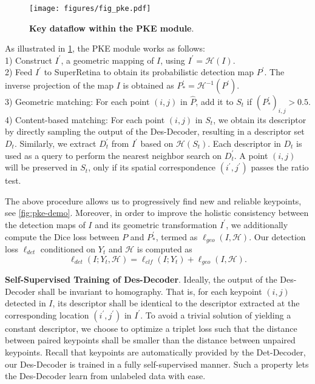 \begin{figure}[htb!]
  \centering
\texttt{[image: figures/fig\_pke.pdf]}
   \caption{\textbf{Key dataflow within the PKE module}.}
   \label{fig:pke-flow}
\end{figure} 
As illustrated in \cref{fig:pke-flow}, the PKE module works as follows: \\
1) Construct $I^\prime$, a geometric mapping of $I$, using $I^\prime = \mathcal{H}(I)$.\\
2) Feed $I^\prime$ to SuperRetina to obtain its probabilistic detection map $P^\prime$. The inverse projection of the map \wrt $I$ is obtained as  $P^\prime_*=\mathcal{H}^{-1}(P^{\prime})$.  \\
3) Geometric matching: For each point $(i,j)$ in $\widehat{P}$, add it to $S_t$ if ${(P^\prime_*)}_{i,j}>0.5$. \\
4) Content-based matching: For each point $(i,j)$ in $S_t$, we obtain its descriptor by directly sampling the output of the Des-Decoder, resulting in a descriptor set $D_t$. Similarly, we extract $D^\prime_t$ from $I^\prime$ based on $\mathcal{H}(S_t)$. Each descriptor in $D_t$ is used as a query to perform the nearest neighbor search on $D^\prime_t$. A point $(i,j)$ will be preserved in $S_t$, only if its spatial correspondence $(i^\prime,j^\prime)$ passes the ratio test.

The above procedure allows us to progressively find new and reliable keypoints, see \cref{fig:pke-demo}. Moreover, in order to improve the holistic consistency between the detection maps of $I$ and its geometric transformation $I^\prime$, we additionally compute the Dice loss between $P$ and $P^\prime_*$, termed as $\ell_{geo}(I,\mathcal{H})$.  Our detection loss $\ell_{det}$ conditioned on  $Y_t$ and $\mathcal{H}$ is computed as 
\begin{equation} \label{eq:det-loss}
\ell_{det}(I; Y_t, \mathcal{H}) = \ell_{clf}(I; Y_t) + \ell_{geo}(I,\mathcal{H}).    
\end{equation}


\textbf{Self-Supervised Training of Des-Decoder}. 
Ideally, the output of the Des-Decoder shall be invariant to homography. That is, for each keypoint $(i,j)$ detected in $I$, its descriptor shall be identical to the descriptor extracted at the corresponding location $(i^\prime, j^\prime)$ in $I^\prime$. To avoid a trivial solution of yielding a constant descriptor, we choose to optimize a triplet loss \cite{schroff2015facenet} such that the distance between paired keypoints shall be smaller than the distance between unpaired keypoints. Recall that  keypoints are automatically provided by the Det-Decoder, our Des-Decoder is trained in a fully self-supervised manner. Such a property lets the Des-Decoder learn from unlabeled data with ease.

